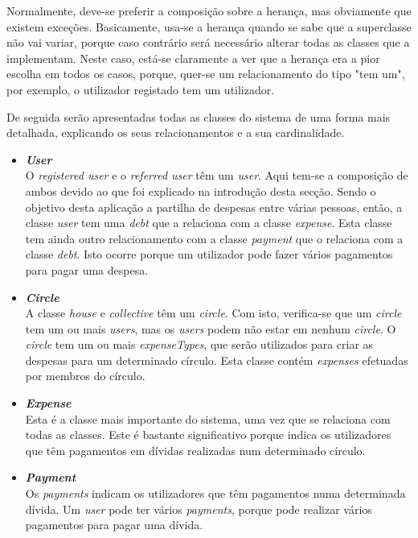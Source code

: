Normalmente, deve-se preferir a composição sobre a herança, mas obviamente que existem exceções. Basicamente, usa-se a herança quando se sabe que a superclasse não vai variar, porque caso contrário será necessário alterar todas as classes que a implementam. Neste caso, está-se claramente a ver que a herança era a pior escolha em todos os casos, porque, quer-se um relacionamento do tipo "tem um", por exemplo, o utilizador registado tem um utilizador.

De seguida serão apresentadas todas as classes do sistema de uma forma mais detalhada, explicando os seus relacionamentos e a sua cardinalidade.
\begin{itemize}
	\item \textbf{\textit{User}}\\
	O \textit{registered user} e o \textit{referred user} têm um \textit{user}. Aqui tem-se a composição de ambos devido ao que foi explicado na introdução desta secção.
	Sendo o objetivo desta aplicação a partilha de despesas entre várias pessoas, então, a classe \textit{user} tem uma \textit{debt} que a relaciona com a classe \textit{expense}. Esta classe tem ainda outro relacionamento com a classe \textit{payment} que o relaciona com a classe \textit{debt}. Isto ocorre porque um utilizador pode fazer vários pagamentos para pagar uma despesa.

	\item \textbf{\textit{Circle}}\\
	A classe \textit{house} e \textit{collective} têm um \textit{circle}. Com isto, verifica-se que um \textit{circle} tem um ou mais \textit{users}, mas os \textit{users} podem não estar em nenhum \textit{circle}.
	O \textit{circle} tem um ou mais \textit{expenseTypes}, que serão utilizados para criar as despesas para um determinado círculo. Esta classe contém \textit{expenses} efetuadas por membros do círculo.

	\item \textbf{\textit{Expense}}\\
	Esta é a classe mais importante do sistema, uma vez que se relaciona com todas as classes. Este é bastante significativo porque indica os utilizadores que têm pagamentos em dívidas realizadas num determinado círculo.

	\item \textbf{\textit{Payment}}\\
	Os \textit{payments} indicam os utilizadores que têm pagamentos numa determinada dívida. Um \textit{user} pode ter vários \textit{payments}, porque pode realizar vários pagamentos para pagar uma dívida.


\end{itemize}
